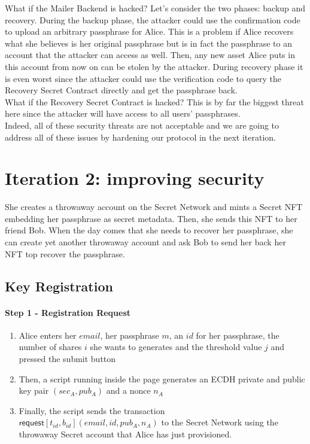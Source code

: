 \documentclass[12pt]{article}
\newcommand{\ms}[1]{\ensuremath{\mathsf{#1}}}
\newcommand{\tx}[3]{\ms{#1}[#2](#3)}
\begin{document}
\begin{enumerate}
What if the Mailer Backend is hacked? Let's consider the two phases: backup and recovery. During the backup phase, the attacker could use the confirmation code to upload an arbitrary passphrase for Alice. This is a problem if Alice recovers what she believes is her original passphrase but is in fact the passphrase to an account that the attacker can access as well. Then, any new asset Alice puts in this account from now on can be stolen by the attacker. During recovery phase it is even worst since the attacker could use the verification code to query the Recovery Secret Contract directly and get the passphrase back. \\

What if the Recovery Secret Contract is hacked? This is by far the biggest threat here since the attacker will have access to all users' passphrases.  \\

Indeed, all of these security threats are not acceptable and we are going to address all of these issues by hardening our protocol in the next iteration. 

\section{Iteration  2: improving security}

She creates a throwaway account on the Secret Network and mints a Secret NFT embedding her passphrase as secret metadata. Then, she sends this NFT to her friend Bob. When the day comes that she needs to recover her passphrase, she can create yet another throwaway account and ask Bob to send her back her NFT top recover the passphrase. 

\subsection{Key Registration}

\paragraph{Step 1 - Registration Request}

\begin{enumerate}[label=1.\arabic*]
  \item Alice enters her $email$, her passphrase $m$, an $id$ for her passphrase, the number of shares $i$ she wants to generates and the threshold value $j$ and pressed the submit button
  \item Then, a script running inside the page generates an ECDH private and public key pair $(sec_A, pub_A)$ and a nonce $n_A$
  \item Finally, the script sends the transaction $\tx{request}{t_{id}, b_{id}}{email, id, pub_A, n_A}$ to the Secret Network using the throwaway Secret account that Alice has just provisioned.
\end{enumerate}


\end{enumerate}
\end{document}
